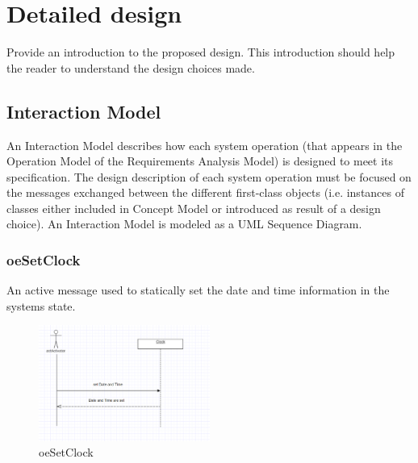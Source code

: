 \chapter{Detailed design}
\label{chap:detDesign}


Provide an introduction to the proposed design. This introduction should help
the reader to understand the design choices made.


\section{Interaction Model}
An Interaction Model describes how each \gls{system operation} (that appears in the
Operation Model of the \msrmessir Requirements Analysis Model) is designed to meet
its specification. The design description of each system operation must be
focused on the messages exchanged between the different first-class objects
(i.e. instances of classes either included in Concept Model or introduced as
result of a design choice). An Interaction Model is modeled as a UML Sequence
Diagram.


\subsection{oeSetClock}
An active message used to statically set the date and time information in the
systems state.

\begin{figure}[H]
\begin{center}
\includegraphics[width=0.5\textwidth]{./images/oeSetClock.eps} 
\end{center}
\caption{oeSetClock}
\end{figure}


